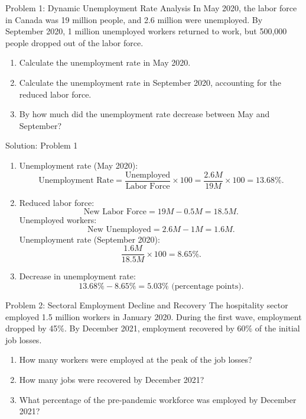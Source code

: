 \documentclass{beamer}
\begin{document}
\begin{frame}{Problem 1: Dynamic Unemployment Rate Analysis}
In May 2020, the labor force in Canada was 19 million people, and 2.6 million were unemployed. By September 2020, 1 million unemployed workers returned to work, but 500,000 people dropped out of the labor force.

\begin{enumerate}
    \item Calculate the unemployment rate in May 2020.
    \item Calculate the unemployment rate in September 2020, accounting for the reduced labor force.
    \item By how much did the unemployment rate decrease between May and September?
\end{enumerate}
\end{frame}

\begin{frame}{Solution: Problem 1}
\begin{enumerate}
    \item Unemployment rate (May 2020): 
    \[
    \text{Unemployment Rate} = \frac{\text{Unemployed}}{\text{Labor Force}} \times 100 = \frac{2.6M}{19M} \times 100 = 13.68\%.
    \]
    \item Reduced labor force: 
    \[
    \text{New Labor Force} = 19M - 0.5M = 18.5M.
    \]
    Unemployed workers: 
    \[
    \text{New Unemployed} = 2.6M - 1M = 1.6M.
    \]
    Unemployment rate (September 2020): 
    \[
    \frac{1.6M}{18.5M} \times 100 = 8.65\%.
    \]
    \item Decrease in unemployment rate: 
    \[
    13.68\% - 8.65\% = 5.03\% \text{ (percentage points)}.
    \]
\end{enumerate}
\end{frame}

\begin{frame}{Problem 2: Sectoral Employment Decline and Recovery}
The hospitality sector employed 1.5 million workers in January 2020. During the first wave, employment dropped by 45\%. By December 2021, employment recovered by 60\% of the initial job losses.

\begin{enumerate}
    \item How many workers were employed at the peak of the job losses?
    \item How many jobs were recovered by December 2021?
    \item What percentage of the pre-pandemic workforce was employed by December 2021?
\end{enumerate}
\end{frame}
\end{document}
